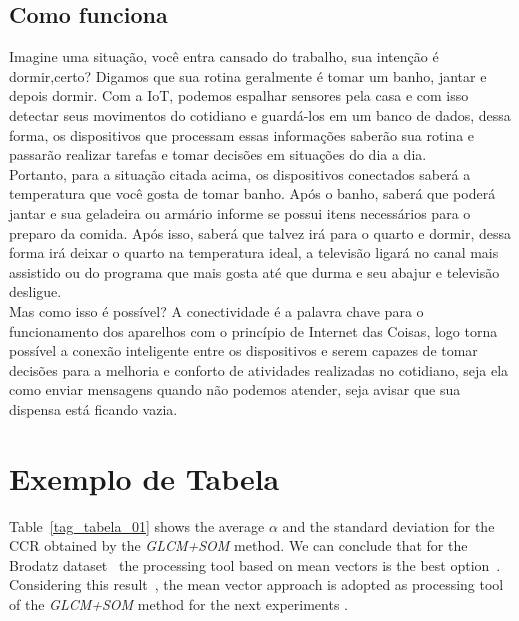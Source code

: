 \documentclass{classe_cn}                 %
\begin{document}
\subsection{Como funciona}
Imagine uma situação, você entra cansado do trabalho, sua intenção 
é dormir,certo? Digamos que sua rotina geralmente é tomar um banho, 
jantar e depois dormir. Com a IoT, podemos espalhar sensores pela 
casa e com isso detectar seus movimentos do cotidiano e guardá-los 
em um banco de dados, dessa forma, os dispositivos que processam 
essas informações saberão sua rotina e passarão realizar tarefas 
e tomar decisões em situações do dia a dia.\\

Portanto, para a situação citada acima, os dispositivos conectados 
saberá a temperatura que você gosta de tomar banho. Após o banho, 
saberá que poderá jantar e sua geladeira ou armário informe se 
possui itens necessários para o preparo da comida. Após isso, 
saberá que talvez irá para o quarto e dormir, dessa forma irá 
deixar o quarto na temperatura ideal, a televisão ligará no canal 
mais assistido ou do programa que mais gosta até que durma e seu 
abajur e televisão desligue.\\

Mas como isso é possível? A conectividade é a palavra chave para o 
funcionamento dos aparelhos com o princípio de Internet das Coisas, 
logo torna possível a conexão inteligente entre os dispositivos e 
serem capazes de tomar decisões para a melhoria e conforto de 
atividades realizadas no cotidiano, seja ela como enviar mensagens 
quando não podemos atender, seja avisar que sua dispensa está ficando vazia.


\section{Exemplo de Tabela}

Table~\ref{tag_tabela_01} shows the average $ \alpha $ and the standard deviation for the CCR \cite{Rosenfeld:1970} obtained by the \textit{GLCM+SOM} method. We can conclude that for the Brodatz dataset~\cite{Domingues:2010} the processing tool based on mean vectors is the best option~\cite{Rosenfeld:1970, Diday:1989}. Considering this result~\cite{Visible:2013}, the mean vector approach is adopted as processing tool of the \textit{GLCM+SOM} method for the next experiments \cite{Fulano:2009}.
\end{document}
